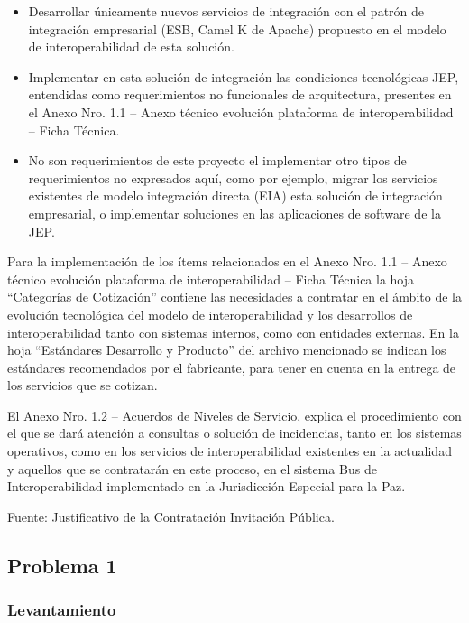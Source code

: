 \documentclass[
  paper=a4,
  ,captions=tableheading
]{scrartcl}
\providecommand{\tightlist}{%
  \setlength{\itemsep}{0pt}\setlength{\parskip}{0pt}}
\begin{document}
\begin{itemize}
\tightlist
\item
  Desarrollar únicamente nuevos servicios de integración con el patrón
  de integración empresarial (ESB, Camel K de Apache) propuesto en el
  modelo de interoperabilidad de esta solución.
\item
  Implementar en esta solución de integración las condiciones
  tecnológicas JEP, entendidas como requerimientos no funcionales de
  arquitectura, presentes en el Anexo Nro. 1.1 -- Anexo técnico
  evolución plataforma de interoperabilidad -- Ficha Técnica.
\item
  No son requerimientos de este proyecto el implementar otro tipos de
  requerimientos no expresados aquí, como por ejemplo, migrar los
  servicios existentes de modelo integración directa (EIA) esta solución
  de integración empresarial, o implementar soluciones en las
  aplicaciones de software de la JEP.
\end{itemize}

Para la implementación de los ítems relacionados en el Anexo Nro. 1.1 --
Anexo técnico evolución plataforma de interoperabilidad -- Ficha Técnica
la hoja ``Categorías de Cotización'' contiene las necesidades a
contratar en el ámbito de la evolución tecnológica del modelo de
interoperabilidad y los desarrollos de interoperabilidad tanto con
sistemas internos, como con entidades externas. En la hoja ``Estándares
Desarrollo y Producto'' del archivo mencionado se indican los estándares
recomendados por el fabricante, para tener en cuenta en la entrega de
los servicios que se cotizan.

El Anexo Nro. 1.2 -- Acuerdos de Niveles de Servicio, explica el
procedimiento con el que se dará atención a consultas o solución de
incidencias, tanto en los sistemas operativos, como en los servicios de
interoperabilidad existentes en la actualidad y aquellos que se
contratarán en este proceso, en el sistema Bus de Interoperabilidad
implementado en la Jurisdicción Especial para la Paz.

Fuente: Justificativo de la Contratación Invitación Pública.

\subsection{Problema 1}\label{sec:problema-1}

\subsubsection{Levantamiento}\label{sec:levantamiento}
\end{document}
